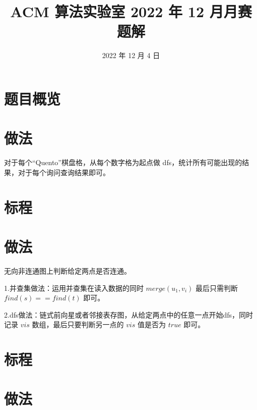 \documentclass{../cpct/ctsol}
\title{ACM 算法实验室 2022 年 12 月月赛题解}
\date{2022 年 12 月 4 日}
\begin{document}
\maketitle
{}

\section*{题目概览}

\solutiontab

\makesolution
\section*{做法}

对于每个“Quento”棋盘格，从每个数字格为起点做 dfs，统计所有可能出现的结果，对于每个询问查询结果即可。

\section*{标程}


\makesolution
\section*{做法}

无向非连通图上判断给定两点是否连通。

1.并查集做法：运用并查集在读入数据的同时 $merge(u_1,v_i)$ 最后只需判断 $find(s) == find(t)$ 即可。

2.dfs做法：链式前向星或者邻接表存图，从给定两点中的任意一点开始dfs，同时记录 $vis$ 数组，最后只要判断另一点的 $vis$ 值是否为 $true$ 即可。

\section*{标程}


\makesolution
\section*{做法}
\end{document}
